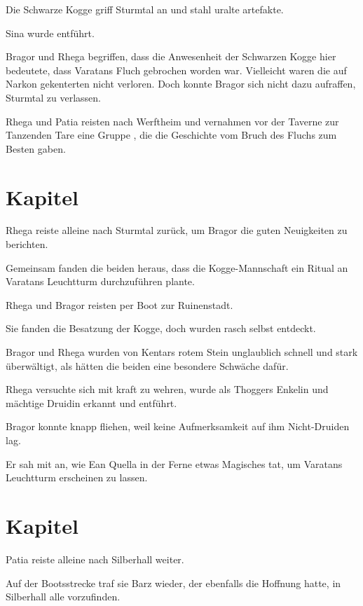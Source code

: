 Die Schwarze Kogge griff Sturmtal an und stahl uralte artefakte.

Sina wurde entführt.

Bragor und Rhega begriffen, dass die Anwesenheit der Schwarzen Kogge hier bedeutete, dass Varatans Fluch gebrochen worden war. Vielleicht waren die auf Narkon gekenterten  nicht verloren. Doch konnte Bragor sich nicht dazu aufraffen, Sturmtal zu verlassen.

Rhega und Patia reisten nach Werftheim und vernahmen vor der Taverne zur Tanzenden Tare eine Gruppe , die die Geschichte vom Bruch des Fluchs zum Besten gaben.



\newpage
\section{Kapitel}

Rhega reiste alleine nach Sturmtal zurück, um Bragor die guten Neuigkeiten zu berichten. 

Gemeinsam fanden die beiden heraus, dass die Kogge-Mannschaft ein Ritual an Varatans Leuchtturm durchzuführen plante.

Rhega und Bragor reisten per Boot zur Ruinenstadt. 

Sie fanden die Besatzung der Kogge, doch wurden rasch selbst entdeckt.

Bragor und Rhega wurden von Kentars rotem Stein unglaublich schnell und stark überwältigt, als hätten die beiden eine besondere Schwäche dafür. 

Rhega versuchte sich mit kraft zu wehren, wurde als Thoggers Enkelin und mächtige Druidin erkannt und entführt.

Bragor konnte knapp fliehen, weil keine Aufmerksamkeit auf ihm Nicht-Druiden lag.

Er sah mit an, wie Ean Quella in der Ferne etwas Magisches tat, um Varatans Leuchtturm erscheinen zu lassen.



\newpage
\section{Kapitel}

Patia reiste alleine nach Silberhall weiter. 

Auf der Bootsstrecke traf sie Barz wieder, der ebenfalls die Hoffnung hatte, in Silberhall alle  vorzufinden. 

